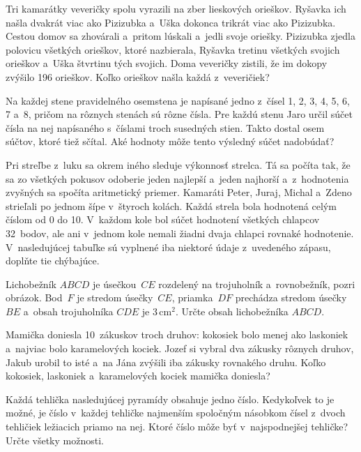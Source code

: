 {%
Tri kamarátky veveričky spolu vyrazili na zber lieskových orieškov.
Ryšavka ich našla dvakrát viac ako Pizizubka a~Uška dokonca trikrát viac ako Pizizubka.
Cestou domov sa zhovárali a~pritom lúskali a~jedli svoje oriešky.
Pizizubka zjedla polovicu všetkých orieškov, ktoré nazbierala, Ryšavka tretinu všetkých svojich orieškov a~Uška štvrtinu tých svojich.
Doma veveričky zistili, že im dokopy zvýšilo 196 orieškov.
Koľko orieškov našla každá z~veveričiek?}

{%
Na každej stene pravidelného osemstena je napísané jedno z~čísel 1, 2, 3, 4, 5, 6, 7 a~8, pričom na rôznych stenách sú rôzne čísla.
Pre každú stenu Jaro určil súčet čísla na nej napísaného s~číslami troch susedných stien.
Takto dostal osem súčtov, ktoré tiež sčítal.
Aké hodnoty môže tento výsledný súčet nadobúdať?
}

{%
Pri streľbe z~luku sa okrem iného sleduje výkonnosť strelca.
Tá sa počíta tak, že sa zo všetkých pokusov odoberie jeden najlepší a~jeden najhorší a~z~hodnotenia zvyšných sa spočíta aritmetický priemer.
Kamaráti Peter, Juraj, Michal a~Zdeno strieľali po jednom šípe v~štyroch kolách.
Každá strela bola hodnotená celým číslom od 0 do 10.
V~každom kole bol súčet hodnotení všetkých chlapcov 32~bodov, ale ani v~jednom kole nemali žiadni dvaja chlapci rovnaké hodnotenie.
V~nasledujúcej tabuľke sú vyplnené iba niektoré údaje z~uvedeného zápasu, doplňte tie chýbajúce.
}

{%
Lichobežník $ABCD$ je úsečkou~$CE$ rozdelený na trojuholník a~rovnobežník, pozri obrázok.
Bod~$F$ je stredom úsečky~$CE$, priamka~$DF$ prechádza stredom úsečky~$BE$ a~obsah trojuholníka $CDE$ je 3\,cm$^2$.
Určte obsah lichobežníka $ABCD$.
%
}

{%
Mamička doniesla 10~zákuskov troch druhov:
kokosiek bolo menej ako laskoniek a~najviac bolo karamelových kociek.
Jozef si vybral dva zákusky rôznych druhov, Jakub urobil to isté a~na Jána zvýšili iba zákusky rovnakého druhu.
Koľko kokosiek, laskoniek a~karamelových kociek mamička doniesla?
}

{%
Každá tehlička nasledujúcej pyramídy obsahuje jedno číslo.
Kedykoľvek to je možné, je číslo v~každej tehličke najmenším spoločným násobkom čísel z~dvoch
tehličiek ležiacich priamo na nej.
Ktoré číslo môže byť v~najspodnejšej tehličke? Určte všetky možnosti.
%
}

